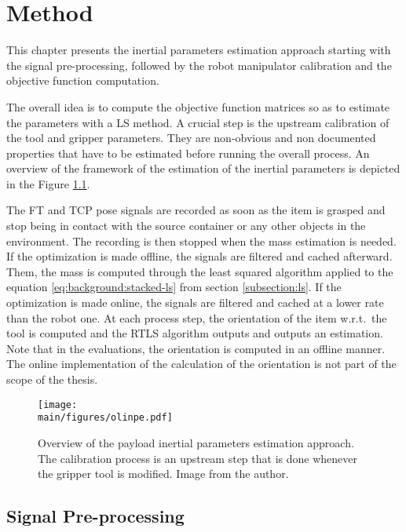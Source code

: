 \documentclass[/home/francois/latex/report/main.tex]{subfiles}
\begin{document}
\chapter{Method}
\label{chapter:method}

This chapter presents the inertial parameters estimation approach starting with the signal pre-processing, followed by the robot manipulator calibration and the objective function computation.

The overall idea is to compute the objective function matrices so as to estimate the parameters with a \ac{LS} method. A crucial step is the upstream calibration of the tool and gripper parameters. They are non-obvious and non documented properties that have to be estimated before running the overall process. An overview of the framework of the estimation of the inertial parameters is depicted in the Figure \ref{fig:method:overall}.

The \ac{FT} and \ac{TCP} pose signals are recorded as soon as the item is grasped and stop being in contact with the source container or any other objects in the environment. The recording is then stopped when the mass estimation is needed. If the optimization is made offline, the signals are filtered and cached afterward. Them, the mass is computed through the least squared algorithm applied to the equation \ref{eq:background:stacked-ls} from section \ref{subsection:ls}. If the optimization is made online, the signals are filtered and cached at a lower rate than the robot one. At each process step, the orientation of the item w.r.t.\ the tool is computed and the \ac{RTLS} algorithm outputs and outputs an estimation. Note that in the evaluations, the orientation is computed in an offline manner. The online implementation of the calculation of the orientation is not part of the scope of the thesis.

\begin{figure}[h]
  \centering
  \texttt{[image: \\main/figures/olinpe.pdf]}
  \caption{Overview of the payload inertial parameters estimation approach. The calibration process is an upstream step that is done whenever the gripper tool is modified. Image from  the author.}
  \label{fig:method:overall}
\end{figure}

\section{Signal Pre-processing}
\label{section:pre-pro}
\end{document}
